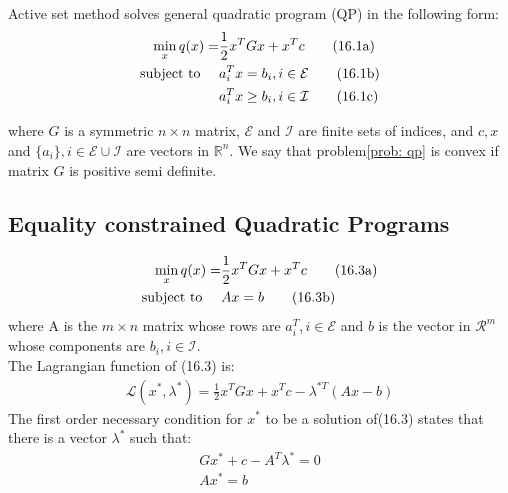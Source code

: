     Active set method solves general quadratic program (QP) in the following form:
    \begin{subequations}
        \label{prob: qp}
        \begin{align}
            \min_x q(x) = &\frac{1}{2} x^TGx + x^Tc \tag{16.1a}   \label{exp: qp_obj} \\
            \text{subject to \quad}  &a_i^Tx = b_i, i \in \mathcal{E} \tag{16.1b} \label{con: equality} \\
            &a_i^Tx \geq b_i, i \in \mathcal{I}  \tag{16.1c} \label{con: inequality}
        \end{align}
    \end{subequations}


    where $G$ is a symmetric $n\times n$ matrix, $\mathcal{E}$ and $\mathcal{I}$ are finite sets of indices, and $c, x$ and
    $\{a_i\}, i\in\mathcal{E}\cup\mathcal{I}$ are vectors in $\mathbb{R}^n$.
    We say that problem\eqref{prob: qp} is convex if matrix $G$ is positive semi definite.

    \subsection{Equality constrained Quadratic Programs} \label{subsec:-ec_qp}
    \begin{subequations}
        \label{prob: ec_qp}
        \begin{align}
            \min_x q(x) = &\frac{1}{2} x^TGx + x^Tc \tag{16.3a}   \label{exp: ec_qp_obj} \\
            \text{subject to \quad}  &Ax = b \tag{16.3b} \label{con: ec_qp}
        \end{align}
    \end{subequations}
    where A is the $m\times n$ matrix whose rows are $a_i^T, i\in\mathcal{E}$ and $b$ is the vector in $\mathcal{R}^m$
    whose components are $b_i, i\in\mathcal{I}$.\\
    The Lagrangian function of (16.3) is:
    \begin{align*}
        \mathcal{L}(x^*, \lambda^*) = \frac{1}{2} x^TGx + x^Tc - \lambda^{*T}(Ax - b)
    \end{align*}
    The first order necessary condition for $x^*$ to be a solution of(16.3) states that there is a vector $\lambda^*$
    such that:
    \begin{align*}
        Gx^* + c - A^T\lambda^* = 0\\
        Ax^* = b
    \end{align*}


